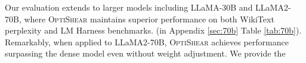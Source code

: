 Our evaluation extends to larger models including LLaMA-30B and LLaMA2-70B, where \textsc{OptiShear} maintains superior performance on both WikiText perplexity and LM Harness benchmarks. (in Appendix \ref{sec:70b} Table \ref{tab:70b}). Remarkably, when applied to LLaMA2-70B, \textsc{OptiShear} achieves performance surpassing the dense model even without weight adjustment. We provide the 




\vspace{-1em}


